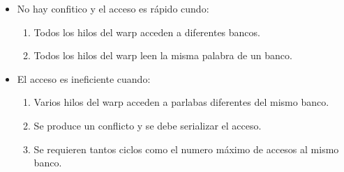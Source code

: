 \documentclass[]{scrartcl}
\begin{document}
\begin{itemize}
	\item No hay confitico y el acceso es rápido cundo:
	\begin{enumerate}
		\item Todos los hilos del warp acceden a diferentes bancos.
		\item Todos los hilos del warp leen la misma palabra de un banco.
	\end{enumerate}
	\item El acceso es ineficiente cuando:
		\begin{enumerate}
		\item Varios hilos del warp acceden a parlabas diferentes del mismo banco.
		\item Se produce un conflicto y se debe serializar el acceso.
		\item Se requieren tantos ciclos como el numero máximo de accesos al mismo banco.
	\end{enumerate}
\end{itemize}
\end{document}
